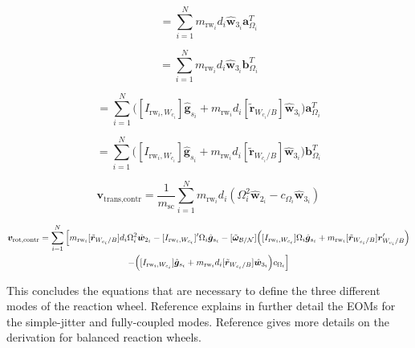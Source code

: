 \begin{equation}
[A_\text{contr}] = \sum\limits_{i=1}^{N}m_{\text{rw}_i}d_i\hat{\bm{w}}_{3_i}\bm{a}_{\Omega_i}^T
\end{equation}

\begin{equation}
[B_\text{contr}] = \sum\limits_{i=1}^{N}m_{\text{rw}_i}d_i\hat{\bm{w}}_{3_i}\bm{b}_{\Omega_i}^T
\end{equation}

\begin{equation}
[C_\text{contr}] = \sum\limits_{i=1}^{N}\Big([I_{\text{rw}_i,W_{c_i}}]\hat{\bm{g}}_{s_i} + m_{\text{rw}_i}d_i[\tilde{\bm{r}}_{W_{c_i}/B}]\hat{\bm{w}}_{3_i}\Big)\bm{a}_{\Omega_i}^T
\end{equation}

\begin{equation}
[D_\text{contr}] = \sum\limits_{i=1}^{N}\Big([I_{\text{rw}_i,W_{c_i}}]\hat{\bm{g}}_{s_i} + m_{\text{rw}_i}d_i[\tilde{\bm{r}}_{W_{c_i}/B}]\hat{\bm{w}}_{3_i}\Big)\bm{b}_{\Omega_i}^T
\end{equation}

\begin{equation}
\bm{v}_\text{trans,contr} = \frac{1}{m_{\text{sc}}}\sum\limits_{i=1}^{N}m_{\text{rw}_i}d_i\left(\Omega_i^2\hat{\bm{w}}_{2_i}-c_{\Omega_i}\hat{\bm{w}}_{3_i}\right)
\end{equation}

\begin{multline}
\bm{v}_\text{rot,contr} = \sum\limits_{i=1}^{N} \Big[ m_{\text{rw}_i}[\tilde{\bm{r}}_{W_{c_i}/B}]d_i \Omega_i^2\hat{\bm{w}}_{2_i}-[I_{\text{rw}_i,W_{c_i}}]'\Omega_i \hat{\bm{g}}_{s_i} -[\tilde{\bm\omega}_{\cal B/N}]\Big([I_{\text{rw}_i,W_{c_i}}]\Omega_i \hat{\bm{g}}_{s_i}+ m_{\text{rw}_i}[\tilde{\bm{r}}_{W_{c_i}/B}]\bm{r}'_{W_{c_i}/B}\Big) \\ 
-\Big([I_{\text{rw}_i,W_{c_i}}]\hat{\bm{g}}_{s_i} + m_{\text{rw}_i}d_i[\tilde{\bm{r}}_{W_{c_i}/B}]\hat{\bm{w}}_{3_i}\Big)c_{\Omega_i} \Big]
\end{multline}

This concludes the equations that are necessary to define the three different modes of the reaction wheel. Reference\cite{Alcorn:2016yq} explains in further detail the EOMs for the simple-jitter and fully-coupled modes. Reference\cite{schaub} gives more details on the derivation for balanced reaction wheels.